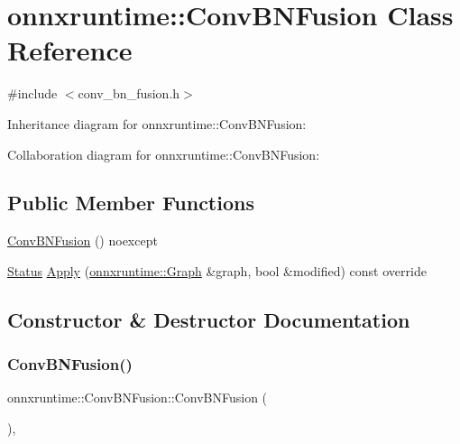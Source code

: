 \hypertarget{classonnxruntime_1_1ConvBNFusion}{}\section{onnxruntime\+:\+:Conv\+B\+N\+Fusion Class Reference}
\label{classonnxruntime_1_1ConvBNFusion}


{\ttfamily \#include $<$conv\+\_\+bn\+\_\+fusion.\+h$>$}



Inheritance diagram for onnxruntime\+:\+:Conv\+B\+N\+Fusion\+:


Collaboration diagram for onnxruntime\+:\+:Conv\+B\+N\+Fusion\+:
\subsection*{Public Member Functions}
\begin{DoxyCompactItemize}
\item 
\mbox{\hyperlink{classonnxruntime_1_1ConvBNFusion_a8e4a0f8a240bd41e9ac6b39a58794bd1}{Conv\+B\+N\+Fusion}} () noexcept
\item 
\mbox{\hyperlink{classonnxruntime_1_1common_1_1Status}{Status}} \mbox{\hyperlink{classonnxruntime_1_1ConvBNFusion_af12cb45d190871716c8e88f73b6b0bfa}{Apply}} (\mbox{\hyperlink{classonnxruntime_1_1Graph}{onnxruntime\+::\+Graph}} \&graph, bool \&modified) const override
\end{DoxyCompactItemize}


\subsection{Constructor \& Destructor Documentation}
\mbox{\label{classonnxruntime_1_1ConvBNFusion_a8e4a0f8a240bd41e9ac6b39a58794bd1}} 
\subsubsection{\texorpdfstring{Conv\+B\+N\+Fusion()}{ConvBNFusion()}}
{\footnotesize\ttfamily onnxruntime\+::\+Conv\+B\+N\+Fusion\+::\+Conv\+B\+N\+Fusion (\begin{DoxyParamCaption}{ }\end{DoxyParamCaption})\hspace{0.3cm}{\ttfamily [inline]}, {\ttfamily [noexcept]}}




